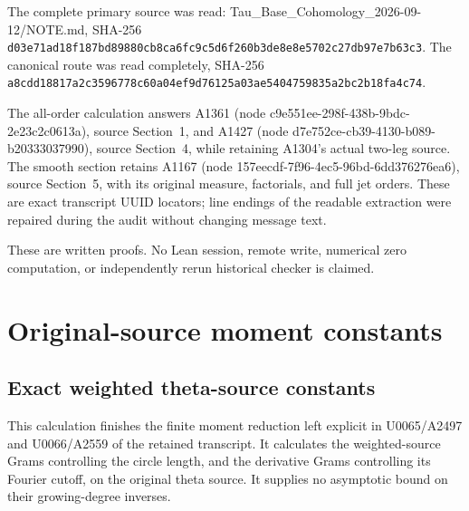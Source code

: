 \documentclass[10pt,a4paper,oneside]{report}
\begin{document}
The complete primary source was read: Tau\_Base\_Cohomology\_2026-09-12/NOTE.md, SHA-256 \nolinkurl{d03e71ad18f187bd89880cb8ca6fc9c5d6f260b3de8e8e5702c27db97e7b63c3}. The canonical route was read completely, SHA-256 \nolinkurl{a8cdd18817a2c3596778c60a04ef9d76125a03ae5404759835a2bc2b18fa4c74}.

The all-order calculation answers A1361 (node c9e551ee-298f-438b-9bdc-2e23c2c0613a), source Section~1, and A1427 (node d7e752ce-cb39-4130-b089-b20333037990), source Section~4, while retaining A1304's actual two-leg source. The smooth section retains A1167 (node 157eecdf-7f96-4ec5-96bd-6dd376276ea6), source Section~5, with its original measure, factorials, and full jet orders. These are exact transcript UUID locators; line endings of the readable extraction were repaired during the audit without changing message text.

These are written proofs. No Lean session, remote write, numerical zero computation, or independently rerun historical checker is claimed.


\endgroup
\clearpage
\chapter{Original-source moment constants}
\begingroup
\begingroup
\def\LCSB{\mathscr B}
\def\LCSV{\mathcal V}
\def\LCSM{\mathcal M}
\def\LCStr{\operatorname{Tr}}
\newtheorem{latecontroltheorem}{Theorem}[section]
\section{Exact weighted theta-source constants}
This calculation finishes the finite moment reduction left explicit in
U0065/A2497 and U0066/A2559 of the retained transcript. It calculates the
weighted-source Grams controlling the circle length, and the derivative
Grams controlling its Fourier cutoff, on the original theta source.
It supplies no asymptotic bound on their growing-degree inverses.
\end{document}
